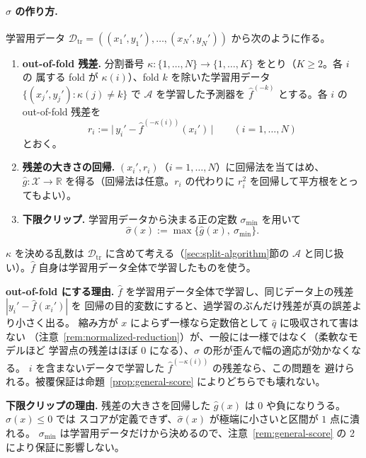 \documentclass[a4paper,11pt]{jsarticle}
\theoremstyle{definition}
\theoremstyle{plain}
\theoremstyle{remark}
\newcommand{\Real}{\mathbb{R}}
\newcommand{\Dtr}{\mathcal{D}_{\mathrm{tr}}}     %
\newcommand{\qhat}{\hat{q}}
\newcommand{\fhat}{\hat{f}}
\begin{document}
\paragraph{$\hat\sigma$ の作り方.}
学習用データ $\Dtr=((x_1',y_1'),\dots,(x_N',y_N'))$ から次のように作る。
\begin{enumerate}
  \item \textbf{out-of-fold 残差.}
    分割番号 $\kappa\colon\{1,\dots,N\}\to\{1,\dots,K\}$ をとり（$K\ge2$。各 $i$ の
    属する fold が $\kappa(i)$）、fold $k$ を除いた学習用データ
    $\{(x_j',y_j'):\kappa(j)\ne k\}$ で $\mathcal{A}$ を学習した予測器を
    $\fhat^{(-k)}$ とする。各 $i$ の out-of-fold 残差を
    \begin{equation*}
      r_i:=\bigl|\,y_i'-\fhat^{(-\kappa(i))}(x_i')\,\bigr|\qquad(i=1,\dots,N)
    \end{equation*}
    とおく。
  \item \textbf{残差の大きさの回帰.}
    $(x_i',r_i)$（$i=1,\dots,N$）に回帰法を当てはめ、
    $\hat g\colon\mathcal{X}\to\Real$ を得る（回帰法は任意。$r_i$ の代わりに
    $r_i^2$ を回帰して平方根をとってもよい）。
  \item \textbf{下限クリップ.}
    学習用データから決まる正の定数 $\sigma_{\min}$ を用いて
    \begin{equation}
      \label{eq:sigma-hat}
      \hat\sigma(x):=\max\{\hat g(x),\ \sigma_{\min}\}.
    \end{equation}
\end{enumerate}
$\kappa$ を決める乱数は $\Dtr$ に含めて考える（\ref{sec:split-algorithm}節の
$\mathcal{A}$ と同じ扱い）。$\fhat$ 自身は学習用データ全体で学習したものを使う。

\textbf{out-of-fold にする理由.}
$\fhat$ を学習用データ全体で学習し、同じデータ上の残差 $|y_i'-\fhat(x_i')|$ を
回帰の目的変数にすると、過学習のぶんだけ残差が真の誤差より小さく出る。
縮み方が $x$ によらず一様なら定数倍として $\qhat$ に吸収されて害はない
（注意~\ref{rem:normalized-reduction}）が、一般には一様ではなく（柔軟なモデルほど
学習点の残差はほぼ $0$ になる）、$\hat\sigma$ の形が歪んで幅の適応が効かなくなる。
$i$ を含まないデータで学習した $\fhat^{(-\kappa(i))}$ の残差なら、この問題を
避けられる。被覆保証は命題~\ref{prop:general-score} によりどちらでも壊れない。

\textbf{下限クリップの理由.}
残差の大きさを回帰した $\hat g(x)$ は $0$ や負になりうる。$\hat\sigma(x)\le0$ では
スコアが定義できず、$\hat\sigma(x)$ が極端に小さいと区間が $1$ 点に潰れる。
$\sigma_{\min}$ は学習用データだけから決めるので、注意~\ref{rem:general-score} の 2
により保証に影響しない。
\end{document}

